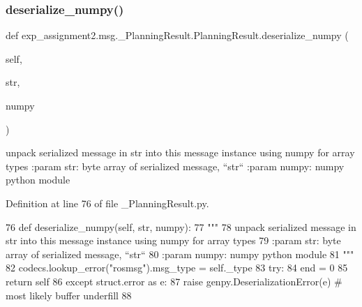 \subsubsection{\texorpdfstring{deserialize\+\_\+numpy()}{deserialize\_numpy()}}
{\footnotesize\ttfamily def exp\+\_\+assignment2.\+msg.\+\_\+\+Planning\+Result.\+Planning\+Result.\+deserialize\+\_\+numpy (\begin{DoxyParamCaption}\item[{}]{self,  }\item[{}]{str,  }\item[{}]{numpy }\end{DoxyParamCaption})}

\begin{DoxyVerb}unpack serialized message in str into this message instance using numpy for array types
:param str: byte array of serialized message, ``str``
:param numpy: numpy python module
\end{DoxyVerb}
 

Definition at line 76 of file \+\_\+\+Planning\+Result.\+py.


\begin{DoxyCode}
76   \textcolor{keyword}{def }deserialize\_numpy(self, str, numpy):
77     \textcolor{stringliteral}{"""}
78 \textcolor{stringliteral}{    unpack serialized message in str into this message instance using numpy for array types}
79 \textcolor{stringliteral}{    :param str: byte array of serialized message, ``str``}
80 \textcolor{stringliteral}{    :param numpy: numpy python module}
81 \textcolor{stringliteral}{    """}
82     codecs.lookup\_error(\textcolor{stringliteral}{"rosmsg"}).msg\_type = self.\_type
83     \textcolor{keywordflow}{try}:
84       end = 0
85       \textcolor{keywordflow}{return} self
86     \textcolor{keywordflow}{except} struct.error \textcolor{keyword}{as} e:
87       \textcolor{keywordflow}{raise} genpy.DeserializationError(e)  \textcolor{comment}{# most likely buffer underfill}
88 
\end{DoxyCode}
\mbox{\label{classexp__assignment2_1_1msg_1_1__PlanningResult_1_1PlanningResult_adf43a60d7a1613ab494b0f71df222e48}} 

